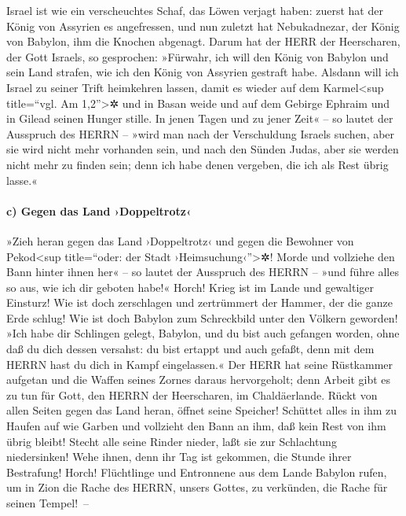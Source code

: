 Israel ist wie ein verscheuchtes Schaf, das Löwen verjagt
haben: zuerst hat der König von Assyrien es angefressen, und nun zuletzt
hat Nebukadnezar, der König von Babylon, ihm die Knochen abgenagt.
Darum hat der HERR der Heerscharen, der Gott Israels, so
gesprochen: »Fürwahr, ich will den König von Babylon und sein Land
strafen, wie ich den König von Assyrien gestraft habe.
Alsdann will ich Israel zu seiner Trift heimkehren
lassen, damit es wieder auf dem Karmel\textless sup title=``vgl. Am
1,2''\textgreater✲ und in Basan weide und auf dem Gebirge Ephraim und in
Gilead seinen Hunger stille. In jenen Tagen und zu jener
Zeit« -- so lautet der Ausspruch des HERRN -- »wird man nach der
Verschuldung Israels suchen, aber sie wird nicht mehr vorhanden sein,
und nach den Sünden Judas, aber sie werden nicht mehr zu finden sein;
denn ich habe denen vergeben, die ich als Rest übrig lasse.«

\hypertarget{c-gegen-das-land-doppeltrotz}{%
\paragraph{c) Gegen das Land
›Doppeltrotz‹}\label{c-gegen-das-land-doppeltrotz}}

»Zieh heran gegen das Land ›Doppeltrotz‹ und gegen die
Bewohner von Pekod\textless sup title=``oder: der Stadt
›Heimsuchung‹''\textgreater✲! Morde und vollziehe den Bann hinter ihnen
her« -- so lautet der Ausspruch des HERRN -- »und führe alles so aus,
wie ich dir geboten habe!« Horch! Krieg ist im Lande und
gewaltiger Einsturz! Wie ist doch zerschlagen und
zertrümmert der Hammer, der die ganze Erde schlug! Wie ist doch Babylon
zum Schreckbild unter den Völkern geworden! »Ich habe dir
Schlingen gelegt, Babylon, und du bist auch gefangen worden, ohne daß du
dich dessen versahst: du bist ertappt und auch gefaßt, denn mit dem
HERRN hast du dich in Kampf eingelassen.« Der HERR hat
seine Rüstkammer aufgetan und die Waffen seines Zornes daraus
hervorgeholt; denn Arbeit gibt es zu tun für Gott, den HERRN der
Heerscharen, im Chaldäerlande. Rückt von allen Seiten
gegen das Land heran, öffnet seine Speicher! Schüttet alles in ihm zu
Haufen auf wie Garben und vollzieht den Bann an ihm, daß kein Rest von
ihm übrig bleibt! Stecht alle seine Rinder nieder, laßt
sie zur Schlachtung niedersinken! Wehe ihnen, denn ihr Tag ist gekommen,
die Stunde ihrer Bestrafung! Horch! Flüchtlinge und
Entronnene aus dem Lande Babylon rufen, um in Zion die Rache des HERRN,
unsers Gottes, zu verkünden, die Rache für seinen Tempel!~--

